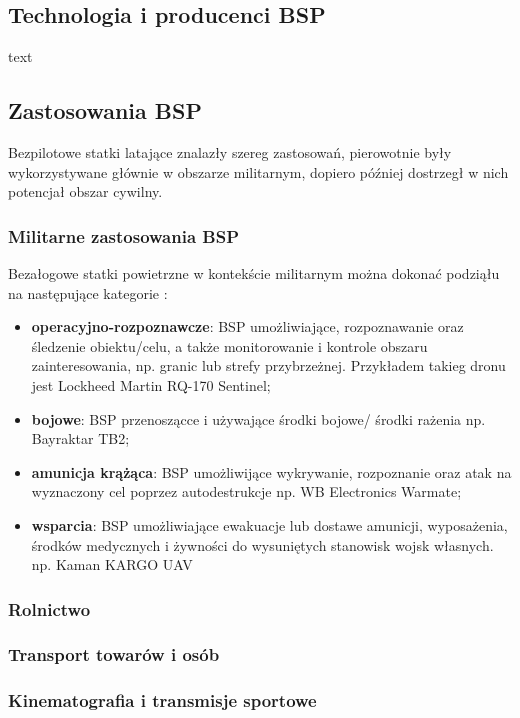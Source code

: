 \subsection{Technologia i producenci BSP}
\hspace{1cm}text

\subsection{Zastosowania BSP}
\hspace{1cm}Bezpilotowe statki latające znalazły szereg zastosowań, pierowotnie były wykorzystywane głównie w obszarze militarnym, dopiero później dostrzegł w nich potencjał obszar cywilny.  

\subsubsection{Militarne zastosowania BSP}
\hspace{1cm}Bezałogowe statki powietrzne w kontekście militarnym można dokonać podziąłu na następujące kategorie \cite{konkurs-mon}: 
\begin{itemize}
  \item \textbf{operacyjno-rozpoznawcze}: BSP umożliwiające, rozpoznawanie oraz śledzenie obiektu/celu, a także monitorowanie i kontrole obszaru zainteresowania, np. granic lub strefy przybrzeżnej. Przykładem takieg dronu jest Lockheed Martin RQ-170 Sentinel;
  \item \textbf{bojowe}: BSP przenoszącce i używające środki bojowe/ środki rażenia np. Bayraktar TB2;
  \item \textbf{amunicja krążąca}: BSP umożliwijące wykrywanie, rozpoznanie oraz atak na wyznaczony cel poprzez autodestrukcje np. WB Electronics Warmate;
  \item \textbf{wsparcia}: BSP umożliwiające ewakuacje lub dostawe amunicji, wyposażenia, środków medycznych i żywności do wysuniętych stanowisk wojsk własnych. np. Kaman KARGO UAV 
\end{itemize}

\subsubsection{Rolnictwo}
\subsubsection{Transport towarów i osób}
\subsubsection{Kinematografia i transmisje sportowe}
